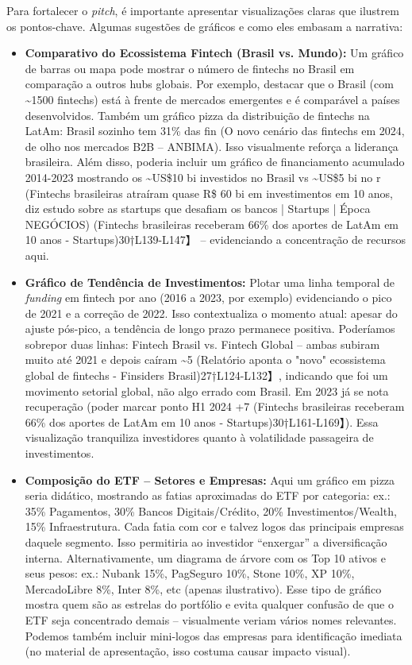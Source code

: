 \documentclass[12pt]{article}
\begin{document}
Para fortalecer o \textit{pitch}, é importante apresentar visualizações claras que ilustrem os pontos-chave. Algumas sugestões de gráficos e como eles embasam a narrativa:

\begin{itemize}
\item \textbf{Comparativo do Ecossistema Fintech (Brasil vs. Mundo):} Um gráfico de barras ou mapa pode mostrar o número de fintechs no Brasil em comparação a outros hubs globais. Por exemplo, destacar que o Brasil (com \textasciitilde1500 fintechs) está à frente de mercados emergentes e é comparável a países desenvolvidos. Também um gráfico pizza da distribuição de fintechs na LatAm: Brasil sozinho tem 31\% das fin (O novo cenário das fintechs em 2024, de olho nos mercados B2B – ANBIMA). Isso visualmente reforça a liderança brasileira. Além disso, poderia incluir um gráfico de financiamento acumulado 2014-2023 mostrando os \textasciitilde US\$10 bi investidos no Brasil vs \textasciitilde US\$5 bi no r (Fintechs brasileiras atraíram quase R\$ 60 bi em investimentos em 10 anos, diz estudo sobre as startups que desafiam os bancos | Startups | Época NEGÓCIOS) (Fintechs brasileiras receberam 66\% dos aportes de LatAm em 10 anos - Startups)30†L139-L147】 – evidenciando a concentração de recursos aqui.

\item \textbf{Gráfico de Tendência de Investimentos:} Plotar uma linha temporal de \textit{funding} em fintech por ano (2016 a 2023, por exemplo) evidenciando o pico de 2021 e a correção de 2022. Isso contextualiza o momento atual: apesar do ajuste pós-pico, a tendência de longo prazo permanece positiva. Poderíamos sobrepor duas linhas: Fintech Brasil vs. Fintech Global – ambas subiram muito até 2021 e depois caíram \textasciitilde5 (Relatório aponta o "novo" ecossistema global de fintechs - Finsiders Brasil)27†L124-L132】, indicando que foi um movimento setorial global, não algo errado com Brasil. Em 2023 já se nota recuperação (poder marcar ponto H1 2024 +7 (Fintechs brasileiras receberam 66\% dos aportes de LatAm em 10 anos - Startups)30†L161-L169】). Essa visualização tranquiliza investidores quanto à volatilidade passageira de investimentos.

\item \textbf{Composição do ETF – Setores e Empresas:} Aqui um gráfico em pizza seria didático, mostrando as fatias aproximadas do ETF por categoria: ex.: 35\% Pagamentos, 30\% Bancos Digitais/Crédito, 20\% Investimentos/Wealth, 15\% Infraestrutura. Cada fatia com cor e talvez logos das principais empresas daquele segmento. Isso permitiria ao investidor “enxergar” a diversificação interna. Alternativamente, um diagrama de árvore com os Top 10 ativos e seus pesos: ex.: Nubank 15\%, PagSeguro 10\%, Stone 10\%, XP 10\%, MercadoLibre 8\%, Inter 8\%, etc (apenas ilustrativo). Esse tipo de gráfico mostra quem são as estrelas do portfólio e evita qualquer confusão de que o ETF seja concentrado demais – visualmente veriam vários nomes relevantes. Podemos também incluir mini-logos das empresas para identificação imediata (no material de apresentação, isso costuma causar impacto visual).


\end{itemize}
\end{document}

